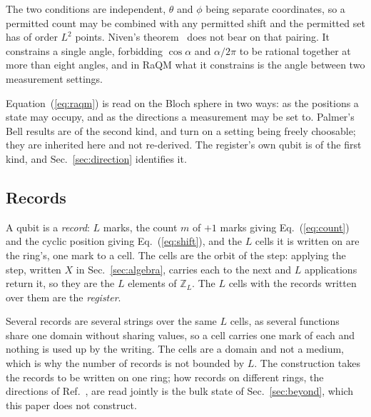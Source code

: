 \documentclass[aps,prd,twocolumn,superscriptaddress,nofootinbib]{revtex4-2}
\begin{document}
The two conditions are independent, $\theta$ and $\phi$ being separate coordinates, so a permitted count may be combined with any permitted shift and the permitted set has of order $L^2$ points. Niven's theorem~\cite{niven1956,jahnel2010} does not bear on that pairing. It constrains a single angle, forbidding $\cos\alpha$ and $\alpha/2\pi$ to be rational together at more than eight angles, and in RaQM what it constrains is the angle between two measurement settings.

Equation~(\ref{eq:raqm}) is read on the Bloch sphere in two ways: as the positions a state may occupy, and as the directions a measurement may be set to. Palmer's Bell results are of the second kind, and turn on a setting being freely choosable; they are inherited here and not re-derived. The register's own qubit is of the first kind, and Sec.~\ref{sec:direction} identifies it.

\subsection{Records}
\label{sec:records}

A qubit is a \emph{record}: $L$ marks, the count $m$ of $+1$ marks giving Eq.~(\ref{eq:count}) and the cyclic position giving Eq.~(\ref{eq:shift}), and the $L$ cells it is written on are the ring's, one mark to a cell. The cells are the orbit of the step: applying the step, written $X$ in Sec.~\ref{sec:algebra}, carries each to the next and $L$ applications return it, so they are the $L$ elements of $\mathbb{Z}_L$. The $L$ cells with the records written over them are the \emph{register}.

Several records are several strings over the same $L$ cells, as several functions share one domain without sharing values, so a cell carries one mark of each and nothing is used up by the writing. The cells are a domain and not a medium, which is why the number of records is not bounded by $L$. The construction takes the records to be written on one ring; how records on different rings, the directions of Ref.~\cite{korytko2026d}, are read jointly is the bulk state of Sec.~\ref{sec:beyond}, which this paper does not construct.
\end{document}

